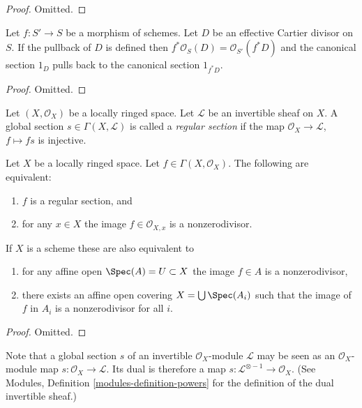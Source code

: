 \begin{proof}
Omitted.
\end{proof}

\begin{lemma}
\label{lemma-pullback-effective-Cartier-divisors}
Let $f : S' \to S$ be a morphism of schemes.
Let $D$ be an effective Cartier divisor on $S$.
If the pullback of $D$ is defined then
$f^*\mathcal{O}_S(D) = \mathcal{O}_{S'}(f^*D)$
and the canonical section $1_D$ pulls back to
the canonical section $1_{f^*D}$.
\end{lemma}

\begin{proof}
Omitted.
\end{proof}

\begin{definition}
\label{definition-regular-section}
Let $(X, \mathcal{O}_X)$ be a locally ringed space.
Let $\mathcal{L}$ be an invertible sheaf on $X$.
A global section $s \in \Gamma(X, \mathcal{L})$ is called a
{\it regular section} if the map $\mathcal{O}_X \to \mathcal{L}$,
$f \mapsto fs$ is injective.
\end{definition}

\begin{lemma}
\label{lemma-regular-section-structure-sheaf}
Let $X$ be a locally ringed space. Let $f \in \Gamma(X, \mathcal{O}_X)$.
The following are equivalent:
\begin{enumerate}
\item $f$ is a regular section, and
\item for any $x \in X$ the image $f \in \mathcal{O}_{X, x}$
is a nonzerodivisor.
\end{enumerate}
If $X$ is a scheme these are also equivalent to
\begin{enumerate}
\item[(3)] for any affine open $\Spec(A) = U \subset X$
the image $f \in A$ is a nonzerodivisor,
\item[(4)] there exists an affine open covering
$X = \bigcup \Spec(A_i)$ such that
the image of $f$ in $A_i$ is a nonzerodivisor for all $i$.
\end{enumerate}
\end{lemma}

\begin{proof}
Omitted.
\end{proof}

\noindent
Note that a global section $s$ of an invertible $\mathcal{O}_X$-module
$\mathcal{L}$ may be seen as an $\mathcal{O}_X$-module map
$s : \mathcal{O}_X \to \mathcal{L}$. Its dual is therefore a
map $s : \mathcal{L}^{\otimes -1} \to \mathcal{O}_X$.
(See Modules, Definition \ref{modules-definition-powers}
for the definition of the dual invertible sheaf.)


